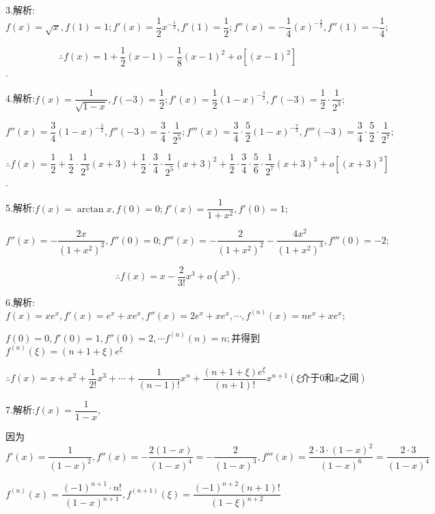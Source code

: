 3.解析:$f(x) = \sqrt x ,f(1) = 1;f'(x) = \dfrac{1}{2}{x^{ - \frac{1}{2}}},f'(1) = \dfrac{1}{2};f''(x) =  - \dfrac{1}{4}{(x)^{ - \frac{3}{2}}},f''(1) =  - \dfrac{1}{4};$

\[ \therefore f(x) = 1 + \dfrac{1}{2}(x - 1) - \dfrac{1}{8}{(x - 1)^2} + o[{(x - 1)^2}]\].

4.解析:$f(x) = \dfrac{1}{{\sqrt {1 - x} }},f( - 3) = \dfrac{1}{2};f'(x) = \dfrac{1}{2}{(1 - x)^{ - \frac{3}{2}}},f'( - 3) = \dfrac{1}{2} \cdot \dfrac{1}{{{2^3}}};$

$f''(x) = \dfrac{3}{4}{(1 - x)^{ - \frac{5}{2}}},f''( - 3) = \dfrac{3}{4} \cdot \dfrac{1}{{{2^5}}};f'''(x) = \dfrac{3}{4} \cdot \dfrac{5}{2}{(1 - x)^{ - \frac{7}{2}}},f'''( - 3) = \dfrac{3}{4} \cdot \dfrac{5}{2} \cdot \dfrac{1}{{{2^7}}};$

\[\therefore f(x) = \dfrac{1}{2} + \dfrac{1}{2} \cdot \dfrac{1}{{{2^3}}}(x + 3) + \dfrac{1}{2} \cdot \dfrac{3}{4} \cdot \dfrac{1}{{{2^5}}}{(x + 3)^2} + \dfrac{1}{2} \cdot \dfrac{3}{4} \cdot \dfrac{5}{6} \cdot \dfrac{1}{{{2^7}}}{(x + 3)^3} + o[{(x + 3)^3}]\].

5.解析:$f(x) = \arctan x,f(0) = 0;f'(x) = \dfrac{1}{{1 + {x^2}}},f'(0) = 1;$

$f''(x) =  - \dfrac{{2x}}{{{{(1 + {x^2})}^2}}},f''(0) = 0;f'''(x) =  - \dfrac{2}{{{{(1 + {x^2})}^2}}} - \dfrac{{4{x^2}}}{{{{(1 + {x^2})}^3}}},f'''(0) =  - 2;$

\[\therefore f(x) = x - \frac{2}{{3!}}{x^3} + o({x^3}).\]

6.解析:$f(x) = x{e^x},f'(x) = {e^x} + x{e^x},f''(x) = 2{e^x} + x{e^x}, \cdots ,{f^{(n)}}(x) = n{e^x} + x{e^x};$

$f(0) = 0,f'(0) = 1,f''(0) = 2, \cdots {f^{(n)}}(n) = n;$并得到${f^{(n)}}(\xi ) = (n + 1 + \xi ){e^\xi }$

\[\therefore f(x) = x + {x^2} + \frac{1}{{2!}}{x^3} +  \cdots  + \frac{1}{{(n - 1)!}}{x^n} + \frac{{(n + 1 + \xi ){e^\xi }}}{{(n + 1)!}}{x^{n + 1}}(\xi 介于 0和x之间)\]

7.解析:$f(x) = \dfrac{1}{{1 - x}}$,

因为$f'(x) = \dfrac{1}{{{{(1 - x)}^2}}},f''(x) =  - \dfrac{{2(1 - x)}}{{{{(1 - x)}^4}}} =  - \dfrac{2}{{{{(1 - x)}^3}}},f'''(x) = \dfrac{{2 \cdot 3 \cdot {{(1 - x)}^2}}}{{{{(1 - x)}^6}}} = \dfrac{{2 \cdot 3}}{{{{(1 - x)}^4}}}$

${f^{(n)}}(x) = \dfrac{{{{( - 1)}^{n + 1}} \cdot n!}}{{{{(1 - x)}^{n + 1}}}},{f^{(n + 1)}}(\xi ) = \dfrac{{{{( - 1)}^{n + 2}}(n + 1)!}}{{{{(1 - \xi )}^{n + 2}}}}$

